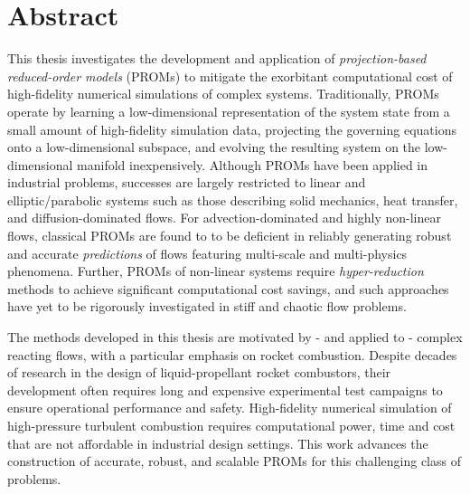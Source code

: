 \chapter{Abstract}


This thesis investigates the development and application of \textit{projection-based reduced-order models} (PROMs) to mitigate the exorbitant computational cost of high-fidelity numerical simulations of complex systems. Traditionally, PROMs operate by learning a low-dimensional representation of the system state from a small amount of high-fidelity simulation data, projecting the governing equations onto a low-dimensional subspace, and evolving the resulting system on the low-dimensional manifold inexpensively. Although PROMs have been applied in industrial problems, successes are largely restricted to linear and elliptic/parabolic systems such as those describing solid mechanics, heat transfer, and diffusion-dominated flows. For advection-dominated and highly non-linear flows, classical PROMs are found to to be deficient in reliably generating robust and accurate {\em predictions} of flows featuring multi-scale and multi-physics phenomena. Further, PROMs of non-linear systems require \textit{hyper-reduction} methods to achieve significant computational cost savings, and such approaches have yet to be rigorously investigated in stiff and chaotic  flow problems.

The methods developed in this thesis are motivated by - and applied to - complex reacting flows, with a particular emphasis on rocket combustion.
Despite decades of research in the design of liquid-propellant rocket combustors, their development often requires long and expensive experimental test campaigns to ensure operational performance and safety. %
High-fidelity numerical simulation of high-pressure turbulent combustion requires computational power, time and cost that are not affordable in industrial design settings. 
This  work advances the construction of accurate, robust, and scalable PROMs for this challenging class of problems.


